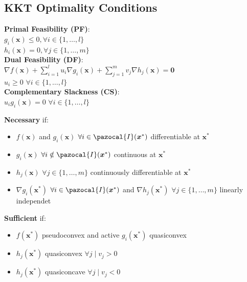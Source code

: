 \documentclass[english]{latex4ei/latex4ei_sheet}
\begin{document}
\begin{sectionbox}
	\subsection{KKT Optimality Conditions}
	\begin{emphbox}
		\textbf{Primal Feasibility (PF)}: \\
		\vspace{0.3em}
		$g_i(\bm{x}) \leq 0, \forall i \in \{1, \dots, l\}$ \\
		$h_i(\bm{x}) = 0, \forall j \in \{1, \dots, m\}$ \\
		\vspace{1em}
		\textbf{Dual Feasibility (DF)}: \\
		$\nabla f(\bm{x}) + \sum\limits_{i=1}^{l} u_i\nabla g_i(\bm{x}) + \sum\limits_{j=1}^{m} v_j\nabla h_j(\bm{x}) = \bm{0}$ \\
		$u_i \geq 0$ $\forall i \in \{1, \dots, l\}$ \\
		\vspace{1em}
		\textbf{Complementary Slackness (CS)}: \\
		\vspace{0.3em}
		$u_i g_i(\bm{x}) = 0$ $\forall i \in \{1, \dots, l\}$
	\end{emphbox}

	\textbf{Necessary} if:
	\begin{itemize}
		\item $f(\bm{x})$ and $g_i(\bm{x})$ $\forall i \in \pazocal{I}(\bm{x}^*)$ differentiable at $\bm{x}^*$
		\item $g_i(\bm{x})$ $\forall i \notin \pazocal{I}(\bm{x}^*)$ continuous at $\bm{x}^*$
		\item $h_j(\bm{x})$ $\forall j \in \{1, \dots, m\}$ continuously differentiable at $\bm{x}^*$
		\item $\nabla g_i(\bm{x}^*)$ $\forall i \in \pazocal{I}(\bm{x}^*)$ and $\nabla h_j(\bm{x}^*)$ $\forall j \in \{1, \dots, m\}$ linearly independet
	\end{itemize}

	\textbf{Sufficient} if:
	\begin{itemize}
		\item $f(\bm{x}^*)$ pseudoconvex and active $g_i(\bm{x}^*)$ quasiconvex
		\item $h_j(\bm{x}^*)$ quasiconvex $\forall j \mid v_j > 0$
		\item $h_j(\bm{x}^*)$ quasiconcave $\forall j \mid v_j < 0$
	\end{itemize}

\end{sectionbox}
\end{document}
